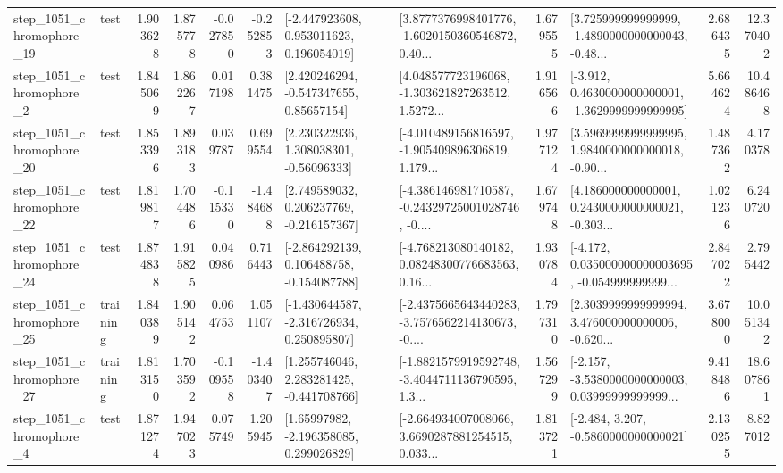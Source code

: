 \begin{tabular}{llrrrrllrlrr}
 step\_1051\_chromophore\_19 &      test &      1.903628 &    1.875778 &     -0.027850 & -0.252853 &    [-2.447923608, 0.953011623, 0.196054019] &  [3.8777376998401776, -1.6020150360546872, 0.40... &       1.679555 &  [3.725999999999999, -1.4890000000000043, -0.48... &            2.686435 &         12.370402 \\
  step\_1051\_chromophore\_2 &      test &      1.845069 &    1.862267 &      0.017198 &  0.381475 &     [2.420246294, -0.547347655, 0.85657154] &  [4.048577723196068, -1.303621827263512, 1.5272... &       1.916566 &  [-3.912, 0.4630000000000001, -1.3629999999999995] &            5.664624 &         10.486468 \\
 step\_1051\_chromophore\_20 &      test &      1.853396 &    1.893183 &      0.039787 &  0.699554 &     [2.230322936, 1.308038301, -0.56096333] &  [-4.010489156816597, -1.905409896306819, 1.179... &       1.977124 &  [3.5969999999999995, 1.9840000000000018, -0.90... &            1.487362 &          4.170378 \\
 step\_1051\_chromophore\_22 &      test &      1.819817 &    1.704486 &     -0.115330 & -1.484688 &    [2.749589032, 0.206237769, -0.216157367] &  [-4.386146981710587, -0.24329725001028746, -0.... &       1.679748 &  [4.186000000000001, 0.2430000000000021, -0.303... &            1.021236 &          6.240720 \\
 step\_1051\_chromophore\_24 &      test &      1.874838 &    1.915825 &      0.040986 &  0.716443 &   [-2.864292139, 0.106488758, -0.154087788] &  [-4.768213080140182, 0.08248300776683563, 0.16... &       1.930784 &  [-4.172, 0.035000000000003695, -0.054999999999... &            2.847022 &          2.795442 \\
 step\_1051\_chromophore\_25 &  training &      1.840389 &    1.905142 &      0.064753 &  1.051107 &   [-1.430644587, -2.316726934, 0.250895807] &  [-2.4375665643440283, -3.7576562214130673, -0.... &       1.797310 &  [2.3039999999999994, 3.476000000000006, -0.620... &            3.678000 &         10.051342 \\
 step\_1051\_chromophore\_27 &  training &      1.813150 &    1.703592 &     -0.109558 & -1.403407 &    [1.255746046, 2.283281425, -0.441708766] &  [-1.8821579919592748, -3.4044711136790595, 1.3... &       1.567299 &  [-2.157, -3.5380000000000003, 0.03999999999999... &            9.418486 &         18.607861 \\
  step\_1051\_chromophore\_4 &      test &      1.871274 &    1.947023 &      0.075749 &  1.205945 &     [1.65997982, -2.196358085, 0.299026829] &  [-2.664934007008066, 3.6690287881254515, 0.033... &       1.813721 &               [-2.484, 3.207, -0.5860000000000021] &            2.130255 &          8.827012 \\

\end{tabular}
